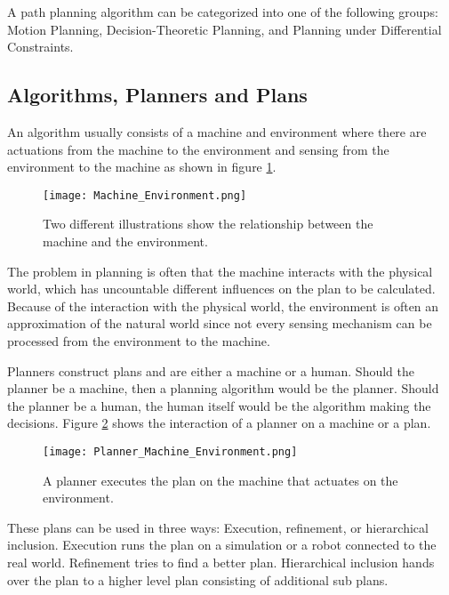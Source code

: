 A path planning algorithm can be categorized into one of the following groups: Motion Planning, Decision-Theoretic Planning, and Planning under Differential Constraints.
\cite{planning_algorithms_steven_m_lavalle}

\subsection{Algorithms, Planners and Plans} \label{sec:Algorithms, Planners and Plans}
An algorithm usually consists of a machine and environment where there are actuations from the machine to the environment and sensing from the environment to the machine as shown in figure \ref{fig:Machine and Environment interaction}.
\begin{figure}[H]
    \centering
    \texttt{[image: Machine\_Environment.png]}
    \caption{Two different illustrations show the relationship between the machine and the environment. \cite{planning_algorithms_steven_m_lavalle}}
    \label{fig:Machine and Environment interaction}
\end{figure}
The problem in planning is often that the machine interacts with the physical world, which has uncountable different influences on the plan to be calculated. Because of the interaction with the physical world, the environment is often an approximation of the natural world since not every sensing mechanism can be processed from the environment to the machine.

Planners construct plans and are either a machine or a human. Should the planner be a machine, then a planning algorithm would be the planner. Should the planner be a human, the human itself would be the algorithm making the decisions. Figure \ref{fig:Planner Machine Environment} shows the interaction of a planner on a machine or a plan.
\begin{figure}[H]
    \centering
    \texttt{[image: Planner\_Machine\_Environment.png]}
    \caption{A planner executes the plan on the machine that actuates on the environment. \cite{planning_algorithms_steven_m_lavalle}}
    \label{fig:Planner Machine Environment}
\end{figure}

These plans can be used in three ways: Execution, refinement, or hierarchical inclusion. Execution runs the plan on a simulation or a robot connected to the real world. Refinement tries to find a better plan. Hierarchical inclusion hands over the plan to a higher level plan consisting of additional sub plans. \cite{planning_algorithms_steven_m_lavalle}

